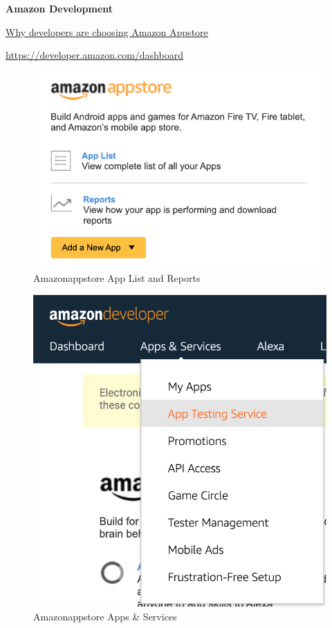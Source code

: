 \textbf{Amazon Development}

\href{https://developer.amazon.com/apps-and-games}{Why developers are choosing Amazon Appstore}

\url{https://developer.amazon.com/dashboard}

\begin{figure}
    \centering
    \includegraphics{images/amazonappstore/ad-app-list-reports-2021-01-07.png}
    \caption{Amazonappstore App List and Reports}
    \label{fig:amazonappstore-app-list-reports}
\end{figure}

\begin{figure}
    \centering
    \includegraphics{images/amazonappstore/ad-apps-and-services-2021-01-07.png}
    \caption{Amazonappstore Apps \& Services}
    \label{fig:amazonappstore-apps-and-services}
\end{figure}

